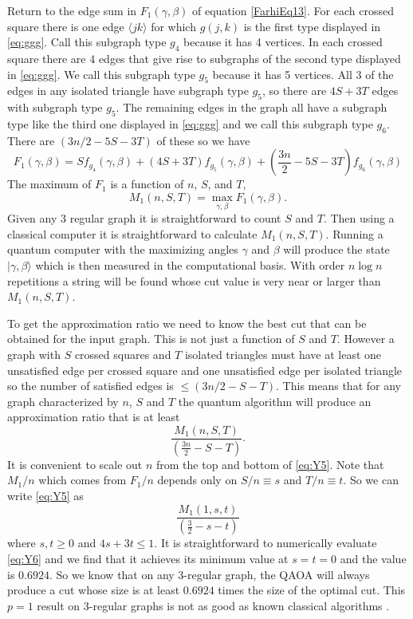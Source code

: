 \documentclass[t11pt,reprint,preprint,preprintnumbers]{revtex4}
\begin{document}
Return to the edge sum in $F_1(\gamma,\beta)$ of equation \eqref{FarhiEq13}.  For each crossed square there is one edge $\langle j k \rangle$  for which $g(j,k)$ is the first type displayed in \eqref{eq:ggg}.  Call this subgraph type $g_4$ because it has 4 vertices.  In each crossed square there are 4 edges that give rise to subgraphs of the second type displayed in \eqref{eq:ggg}.  We call this subgraph type $g_5$ because it has 5 vertices.  All 3 of the edges in any isolated triangle have subgraph type $g_5$, so there are $4S+3T$ edges with subgraph type $g_5$.  The remaining edges in the graph all have a subgraph type like the third one displayed in \eqref{eq:ggg} and we call this subgraph type $g_6$.  There are $(3n/2 - 5S - 3T)$ of these so we have
\begin{equation}\label{eq:farhi34}
F_1(\gamma,\beta) = S f_{g_4}(\gamma,\beta) + \left(4 S + 3 T\right)f_{g_5}(\gamma,\beta) + \left(\frac{3n}{2} - 5S - 3T \right)f_{g_6}(\gamma,\beta) 
\end{equation}
\noindent The maximum of $F_1$ is a function of $n$, $S$, and $T$,
\begin{equation}
M_1(n,S,T) = \max_{\gamma,\beta} F_1(\gamma,\beta).
\end{equation}
Given any 3 regular graph it is straightforward to count $S$ and $T$.  Then using a classical computer it is straightforward to calculate $M_1(n,S,T)$.  Running a quantum computer with the maximizing angles $\gamma$ and $\beta$ will produce the state $|\gamma, \beta \rangle$ which is then measured in the computational basis.   With order $n \log n$ repetitions a string will be found whose cut value is very near or larger than $M_1(n,S,T)$.  

To get the approximation ratio we need to know the best cut that can be obtained for the input graph.  This is not just a function of $S$ and $T$.  However a graph with $S$ crossed squares and $T$ isolated triangles must have at least one unsatisfied edge per crossed square and one unsatisfied edge per isolated triangle so the number of satisfied edges is $\leq (3n/2 - S - T)$.    This means that for any graph characterized by $n$, $S$ and $T$ the quantum algorithm will produce an approximation ratio that is at least 
\begin{equation}
\frac{M_1(n,S,T)}{\left( \frac{3n}{2} - S - T \right)} \label{eq:Y5}.
\end{equation}
It is convenient to scale out $n$ from the top and bottom of \eqref{eq:Y5}.  Note that $M_1/n$ which comes from $F_1/n$ depends only on $S/n \equiv s$ and $T/n \equiv t$.  So we can write \eqref{eq:Y5} as
\begin{equation}
\frac{M_1(1,s,t)}{\left( \frac{3}{2} - s - t \right)} \label{eq:Y6}
\end{equation}
where $s,t \geq 0$ and $4s + 3t \leq 1.$  It is straightforward to numerically evaluate \eqref{eq:Y6} and we find that it achieves its minimum value at $s = t = 0$ and the value is $0.6924$.  So we know that on any 3-regular graph, the QAOA will always produce a cut whose size is at least $0.6924$ times the size of the optimal cut.  This $p=1$ result on 3-regular graphs is not as good as known classical algorithms \cite{halperin-2004}.
\end{document}
